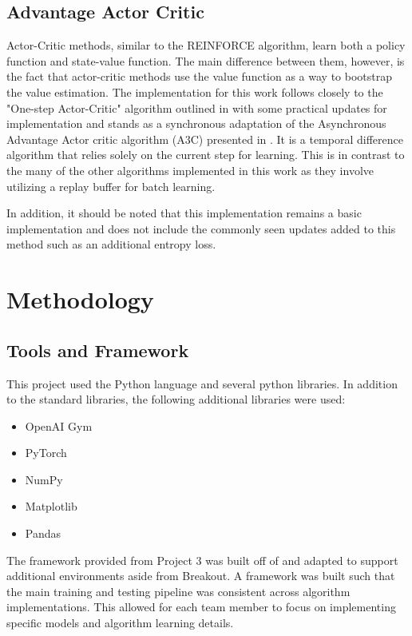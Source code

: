 \documentclass[conference]{IEEEtran}
\begin{document}
\subsection{Advantage Actor Critic}
Actor-Critic methods, similar to the REINFORCE algorithm, learn both a policy function and state-value function.
The main difference between them, however, is the fact that actor-critic methods use the value function as a way to bootstrap the value estimation.
The implementation for this work follows closely to the "One-step Actor-Critic" algorithm outlined in \cite{ReinforcementLearningBook} with some practical updates for implementation and stands as a synchronous adaptation of the Asynchronous Advantage Actor critic algorithm (A3C) presented in \cite{mnih2016asynchronous}.
It is a temporal difference algorithm that relies solely on the current step for learning.
This is in contrast to the many of the other algorithms implemented in this work as they involve utilizing a replay buffer for batch learning.

In addition, it should be noted that this implementation remains a basic implementation and does not include the commonly seen updates added to this method such as an additional entropy loss.

\section{Methodology} \label{methodology}

\subsection{Tools and Framework}
This project used the Python language and several python libraries. 
In addition to the standard libraries, the following additional libraries were used:
 
\begin{itemize}
    \item OpenAI Gym \cite{openaigym}
    \item PyTorch
    \item NumPy
    \item Matplotlib
    \item Pandas
\end{itemize}

The framework provided from Project 3 was built off of and adapted to support additional environments aside from Breakout.
A framework was built such that the main training and testing pipeline was consistent across algorithm implementations.
This allowed for each team member to focus on implementing specific models and algorithm learning details.
\end{document}
